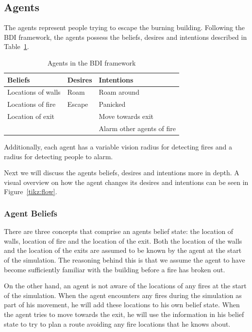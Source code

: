 \documentclass[a4paper]{article}
\begin{document}
\subsection{Agents}
The agents represent people trying to escape the burning building.
Following the BDI framework, the agents possess the beliefs, desires and
intentions described in Table~\ref{tbl:bdi}.
\begin{table}[h!]
  \centering
  \begin{tabular}{lll}
    \toprule
    Beliefs & Desires & Intentions \\
    \midrule
    Locations of walls & Roam & Roam around \\
    Locations of fire & Escape & Panicked \\
    Location of exit &  & Move towards exit \\
    & & Alarm other agents of fire \\
    \bottomrule
  \end{tabular}
  \caption{Agents in the BDI framework}
  \label{tbl:bdi}
\end{table}

Additionally, each agent has a variable vision radius for detecting fires 
and a radius for detecting people to alarm.

Next we will discuss the agents beliefs, desires and intentions more in depth. A visual overview on how the agent changes its desires and intentions can be seen in Figure~\ref{tikz:flow}.


\subsubsection{Agent Beliefs}
There are three concepts that comprise an agents belief state: the location of walls, location of fire and the location of the exit. Both the location of the walls and  the location of the exits are assumed to be known by the agent at the start of the simulation. The reasoning behind this is that we assume the agent to have become sufficiently familiar with the building before a fire has broken out. 

On the other hand, an agent is not aware of the locations of any fires at the start of the simulation. When the agent encounters any fires during the simulation as part of his movement, he will add these locations to his own belief state. When the agent tries to move towards the exit, he will use the information in his belief state to try to plan a route avoiding any fire locations that he knows about. 
\end{document}
